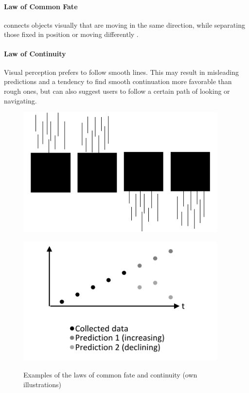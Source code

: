 \paragraph*{Law of Common Fate} connects objects visually that are moving in the same direction, while separating those fixed in position or moving differently \parencite{Todorovic.2008}.
\paragraph*{Law of Continuity} Visual perception prefers to follow smooth lines. This may result in misleading predictions and a tendency to find smooth continuation more favorable than rough ones, but can also suggest users to follow a certain path of looking or navigating. \parencites{Bakar.2017}{Todorovic.2008}
\begin{figure}[H] 
    \begin{minipage}[b]{.5\linewidth}
        \centering\includegraphics[width=0.94\textwidth]{img/fate.pdf}
        \label{fig:fate}
    \end{minipage}%
    \begin{minipage}[b]{.5\linewidth}
        \centering\includegraphics[width=0.94\textwidth]{img/continuity.pdf}
        \label{fig:con}
    \end{minipage}
    \caption[Laws of Common Fate and Continuity]{Examples of the laws of common fate and continuity (own illustrations)}\label{fig:law3}
\end{figure}
